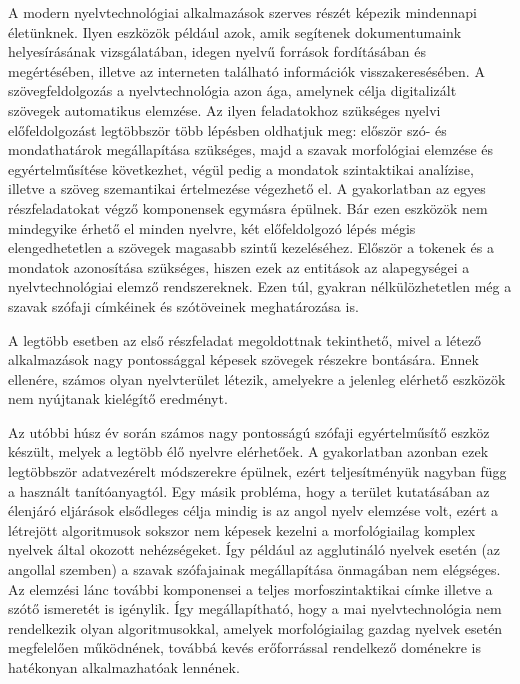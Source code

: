
A modern nyelvtechnológiai alkalmazások szerves részét képezik mindennapi életünknek.
Ilyen eszközök például azok, amik segítenek dokumentumaink helyesírásának vizsgálatában, idegen nyelvű források fordításában és megértésében, illetve az interneten található információk visszakeresésében.
A szövegfeldolgozás a nyelvtechnológia azon ága, amelynek célja digitalizált szövegek automatikus elemzése.
Az ilyen feladatokhoz szükséges nyelvi előfeldolgozást legtöbbször több lépésben oldhatjuk meg: először szó- és mondathatárok megállapítása szükséges, majd a szavak morfológiai elemzése és egyértelműsítése következhet, végül pedig a mondatok szintaktikai analízise, illetve a szöveg szemantikai értelmezése végezhető el.
A gyakorlatban az egyes részfeladatokat végző komponensek egymásra épülnek.
Bár ezen eszközök nem mindegyike érhető el minden nyelvre, két előfeldolgozó lépés mégis elengedhetetlen a szövegek magasabb szintű kezeléséhez. 
Először a tokenek és a mondatok azonosítása szükséges, hiszen ezek az entitások az alapegységei a nyelvtechnológiai elemző rendszereknek.
Ezen túl, gyakran nélkülözhetetlen még a szavak szófaji címkéinek és szótöveinek meghatározása is.

A legtöbb esetben az első részfeladat megoldottnak tekinthető, mivel a létező alkalmazások nagy pontossággal képesek szövegek részekre bontására.
Ennek ellenére, számos olyan nyelvterület létezik, amelyekre a jelenleg elérhető eszközök nem nyújtanak kielégítő eredményt.

Az utóbbi húsz év során számos nagy pontosságú szófaji egyértelműsítő eszköz készült, melyek a legtöbb élő nyelvre elérhetőek.
A gyakorlatban azonban ezek legtöbbször adatvezérelt módszerekre épülnek, ezért teljesítményük nagyban függ a használt tanítóanyagtól.
Egy másik probléma, hogy a terület kutatásában az élenjáró eljárások elsődleges célja mindig is az angol nyelv elemzése volt, ezért a létrejött algoritmusok sokszor nem képesek kezelni a morfológiailag komplex nyelvek által okozott nehézségeket.
Így például az agglutináló nyelvek esetén (az angollal szemben) a szavak szófajainak megállapítása önmagában nem elégséges.
Az elemzési lánc további komponensei a teljes morfoszintaktikai címke illetve a szótő ismeretét is igénylik.
Így megállapítható, hogy a mai nyelvtechnológia nem rendelkezik olyan algoritmusokkal, amelyek morfológiailag gazdag nyelvek esetén megfelelően működnének, továbbá kevés erőforrással rendelkező doménekre is hatékonyan alkalmazhatóak lennének.

